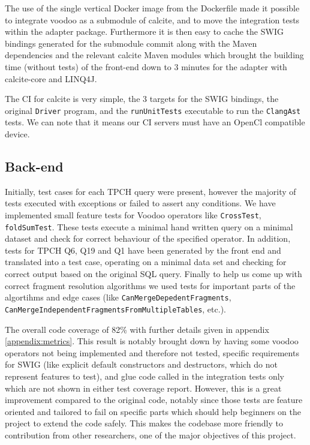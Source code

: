 The use of the single vertical Docker image from the Dockerfile made it possible to integrate voodoo as a submodule of calcite, and to move the integration tests within the adapter package. Furthermore it is then easy to cache the SWIG bindings generated for the submodule commit along with the Maven dependencies and the relevant calcite Maven modules which brought the building time (without tests) of the front-end down to 3 minutes for the adapter with calcite-core and LINQ4J.

The CI for calcite is very simple, the 3 targets for the SWIG bindings, the original \texttt{Driver} program, and the \texttt{runUnitTests} executable to run the \texttt{ClangAst} tests. We can note that it means our CI servers must have an OpenCl compatible device.

\subsection{Back-end}

Initially, test cases for each TPCH query were present, however the majority of tests executed with exceptions or failed to assert any conditions. We have implemented small feature tests for Voodoo operators like \texttt{CrossTest}, \texttt{foldSumTest}. These tests execute a minimal hand written query on a minimal dataset and check for correct behaviour of the specified operator. In addition, tests for TPCH Q6, Q19 and Q1 have been generated by the front end and translated into a test case, operating on a minimal data set and checking for correct output based on the original SQL query. Finally to help us come up with correct fragment resolution algorithms we used tests for important parts of the algortihms and edge cases (like \texttt{CanMergeDepedentFragments}, \texttt{CanMergeIndependentFragmentsFromMultipleTables}, etc.). 

The overall code coverage of 82\% with further details given in appendix \ref{appendix:metrics}. This result is notably brought down by having some voodoo operators not being implemented and therefore not tested, specific requirements for SWIG (like explicit default constructors and destructors, which do not represent features to test), and glue code called in the integration tests only which are not shown in either test coverage report. However, this is a great improvement compared to the original code, notably since those tests are feature oriented and tailored to fail on specific parts which should help beginners on the project to extend the code safely. This makes the codebase more friendly to contribution from other researchers, one of the major objectives of this project.

